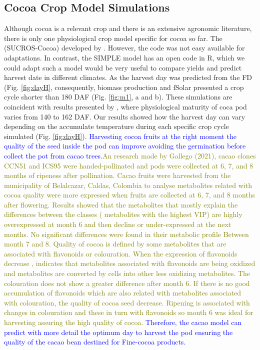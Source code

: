 \documentclass[gene,journal,article,submit,moreauthors,pdftex]{Definitions/mdpi}
\begin{document}
\subsection{Cocoa Crop Model Simulations}
Although cocoa is a relevant crop and there is an extensive agronomic literature, there is only one physiological crop model specific for cocoa so far. The (SUCROS-Cocoa) developed by \cite{zuidema2005}. However, the code was not easy available for adaptations. In contrast, the SIMPLE model has an open code in R, which we could adapt such a model would be very useful to compare yields and predict harvest date in different climates. As the harvest day was predicted from the FD (Fig. \ref{fig:dayH}, consequently, biomass production and fSolar presented a crop cycle shorter than 180 DAF (Fig. \ref{fig:m1}, a and b). These simulations are coincident with results presented by \cite{lopez2018}, where physiological maturity of coca pod varies from 140 to 162 DAF.  Our results showed how the harvest day can vary depending on the accumulate temperature during each specific crop cycle simulated (Fig. \ref{fig:dayH}). \textcolor{blue} {Harvesting cocoa fruits at the right moment the quality of the seed inside the pod can improve avoiding the germination before collect the pot from  cacao trees.}\textcolor{olive} {An research made by Gallego (2021), cacao clones CCN51 and ICS95 were handed-pollinated and pods were collected at 6, 7, and 8 months of ripeness after pollination. Cacao fruits were harvested from the municipality of Belalcazar, Caldas, Colombia to analyse metabolites related with cocoa quality were more expressed when fruits are collected at 6, 7, and 8 months after flowering.  Results showed that the metabolites that mostly explain the differences between the classes ( metabolites with the highest VIP) are highly overexpressed at month 6 and then decline or under-expressed at the next months.  No significant differences were found in their metabolic profile Between month 7 and 8.
Quality of cocoa is defined by  some metabolites that are associated with flavonoids or colouration. When the expression of flavonoids decrease , indicates  that  metabolites  associated with flavonoids  are being oxidized and metabolites are converted by cells into other less oxidizing metabolites. The colouration does not show a greater difference after month 6. If there is no good  accumulation of flavonoids which are also related with metabolites associated with colouration, the quality of cocoa seed decrease. Ripening is associated with changes in colouration and these in turn with flavonoids so month 6 was ideal for harvesting assuring the high quality of cocoa. } \textcolor{blue} { Therefore, the cacao model can predict with more detail the optimum day to harvest the pod ensuring the quality of the cacao bean  destined for Fine-cocoa products. } 
\end{document}
